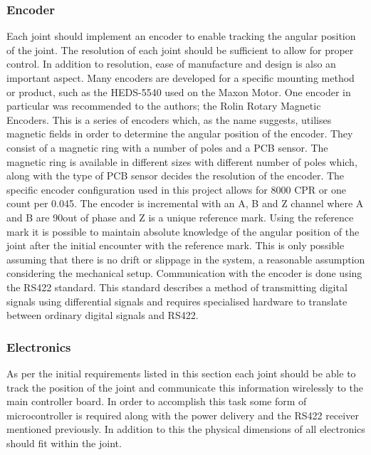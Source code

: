 \subsubsection{Encoder} %
\label{ssub:encoder}
Each joint should implement an encoder to enable tracking the angular position of the joint.
The resolution of each joint should be sufficient to allow for proper control.
In addition to resolution, ease of manufacture and design is also an important aspect.
Many encoders are developed for a specific mounting method or product, such as the HEDS-5540 used on the Maxon Motor.
One encoder in particular was recommended to the authors; the Rolin Rotary Magnetic Encoders.
This is a series of encoders which, as the name suggests, utilises magnetic fields in order to determine the angular position of the encoder.
They consist of a magnetic ring with a number of poles and a PCB sensor.
The magnetic ring is available in different sizes with different number of poles which, along with the type of PCB sensor decides the resolution of the encoder.
The specific encoder configuration used in this project allows for 8000 CPR or one count per 0.045\degree.
The encoder is incremental with an A, B and Z channel where A and B are 90\degree out of phase and Z is a unique reference mark.
Using the reference mark it is possible to maintain absolute knowledge of the angular position of the joint after the initial encounter with the reference mark.
This is only possible assuming that there is no drift or slippage in the system, a reasonable assumption considering the mechanical setup.
Communication with the encoder is done using the RS422 standard.
This standard describes a method of transmitting digital signals using differential signals and requires specialised hardware to translate between ordinary digital signals and RS422.

\subsubsection{Electronics} %
\label{ssub:electronics}
As per the initial requirements listed in this section each joint should be able to track the position of the joint and communicate this information wirelessly to the main controller board.
In order to accomplish this task some form of microcontroller is required along with the power delivery and the RS422 receiver mentioned previously.
In addition to this the physical dimensions of all electronics should fit within the joint.
